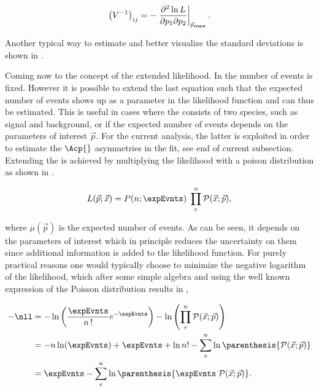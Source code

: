 \begin{equation}
  \centering
\left( V^{-1} \right)_{ij} = - \left. \frac{\partial^2\ln L}{\partial p_1 \partial p_2} \right|_{ \vec{p}_{\rm\bf max}}.
\label{covariance}
\end{equation}

\noindent Another typical way to estimate and better visualize the standard deviations is shown in .

Coming now to the concept of the extended likelihood. In  the number of events is fixed. However it is possible to
extend the last equation such that the expected number of events shows up as a parameter in the likelihood function and can thus be estimated.
This is useful in cases where the \pdf consists of two species, such as signal and background, or if the expected number of events depends on the
parameters of interest $\vec{p}$. For the current analysis, the latter is exploited in order to estimate the $\Acp{}$ asymmetries in the fit,
see end of current subsection. Extending the \pdf is achieved by multiplying the likelihood with a poison distribution as shown in .

\begin{equation}
  \centering
L(\vec{p};\vec{x}) = P(n;\expEvnts) \; \prod_e^n \mathcal{P}(\vec{x};\vec{p}),
\label{extlikelihood}
\end{equation}

\noindent where $\mu(\vec{p})$ is the expected number of events. As can be seen, it depends on the parameters of interest which in
principle reduces the uncertainty on them since additional information is added to the likelihood function.
For purely practical reasons one would typically choose to minimize the negative logarithm of the likelihood, which after some simple
algebra and using the well known expression of the Poisson distribution results in ,

\begin{align}
  \centering
  -\nll &= -\ln\left( \frac{\expEvnts}{n\,!} e^{-\expEvnts } \right) - \ln\left( \prod_e^n \mathcal{P}(\vec{x};\vec{p}) \right)  \nonumber \\
        &= - n\ln(\expEvnts) + \expEvnts  + \ln n! - \sum_e^n \ln\parenthesis{\mathcal{P}(\vec{x};\vec{p})} \nonumber \\
        &=  \expEvnts  - \sum_e^n \ln\parenthesis{\expEvnts \; \mathcal{P}(\vec{x};\vec{p}) }.
\label{extloglikelihood}
\end{align}

